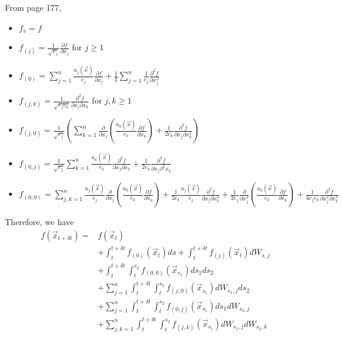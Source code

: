 \documentclass[12pt]{article}
\begin{document}
From page 177,
\begin{itemize}
\item $f_v = f$
\item $f_{(j)} = \frac{1}{\sqrt{e_j}} \frac{\partial f}{\partial x_j}$ for $j \ge 1$
\item $f_{(0)} = \sum_{j=1}^n \frac{a_j(\vec{x})}{e_j} \frac{\partial f}{\partial x_j} + \frac{1}{2}\sum_{j=1}^n \frac{1}{e_j} \frac{\partial^2 f}{\partial x_j^2}$
\item $f_{(j, k)} = \frac{1}{\sqrt{e_j e_k}} \frac{\partial^2 f}{\partial x_j \partial x_k}$ for $j,k \ge 1$
\item $f_{(j,0)} = \frac{1}{\sqrt{e_j}} \left( \sum_{k=1}^n \frac{\partial}{\partial x_j} \left( \frac{a_k(\vec{x})}{e_k} \frac{\partial f}{\partial x_k} \right) + \frac{1}{2 e_k} \frac{\partial^3 f}{\partial x_j \partial x_k^2} \right)$
\item $f_{(0, j)} = \frac{1}{\sqrt{e_j}} \sum_{k=1}^n \frac{a_k(\vec{x})}{e_k} \frac{\partial^2 f}{\partial x_j \partial x_k} +\frac{1}{2 e_k}  \frac{\partial^3 f}{\partial x_j \partial^2 x_k}$
\item $f_{(0,0)} = \sum_{j,k=1}^n \frac{a_j(\vec{x})}{e_j} \frac{\partial}{\partial x_j} \left( \frac{a_k(\vec{x})}{e_k} \frac{\partial f}{\partial x_k} \right) + \frac{1}{2 e_k}\frac{a_j(\vec{x})}{e_j} \frac{\partial^3 f}{\partial x_j \partial x_k^2} + \frac{1}{2 e_j} \frac{\partial}{\partial x_j^2} \left( \frac{a_k(\vec{x})}{e_k} \frac{\partial f}{\partial x_k} \right) + \frac{1}{4 e_j e_k} \frac{\partial^4 f}{\partial x_j^2 \partial x_k^2}$
\end{itemize}
%
Therefore, we have
%
\begin{equation} 
\begin{aligned}
f(\vec{x}_{t+\delta t}) =&
f(\vec{x}_t) \\
&+ \int_t^{t + \delta t} f_{(0)}(\vec{x}_t) ds
+ \int_t^{t + \delta t} f_{(j)}(\vec{x}_t) dW_{s,j} \\
&+ \int_t^{t+\delta t} \int_t^{s_2} f_{(0,0)}(\vec{x}_{s_1}) ds_1 ds_2 \\
&+ \sum_{j=1}^n \int_t^{t+\delta t} \int_t^{s_2} f_{(j,0)}(\vec{x}_{s_1}) dW_{s_1, j} ds_2 \\
&+ \sum_{j=1}^n \int_t^{t+\delta t} \int_t^{s_2} f_{(0,j)}(\vec{x}_{s_1}) ds_1 dW_{s_2, j} \\
&+ \sum_{j, k=1}^n \int_t^{t+\delta t} \int_t^{s_2} f_{(j,k)}(\vec{x}_{s_1}) dW_{s_1, j} dW_{s_2, k} 
\end{aligned}
\end{equation}
\end{document}
